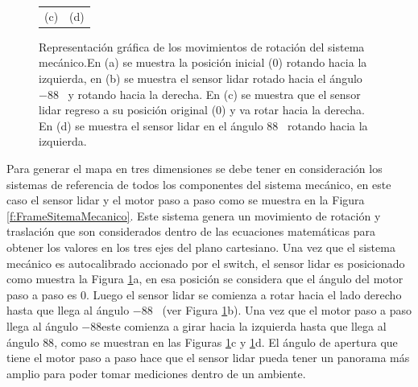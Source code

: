 \begin{figure}
\begin{tabular}{cc}
        (c)&(d)
    \end{tabular}
  \captionsetup{font=footnotesize}
    \caption{\label{f:Rot3D}Representación gráfica de los movimientos de rotación del sistema 
    mecánico.En (a) se muestra la posición inicial (0\grad) rotando hacia la izquierda, en (b) se 
    muestra el sensor lidar rotado hacia el ángulo $-88$\grad~ y rotando hacia la derecha. En (c) 
    se muestra que el sensor lidar regreso a su posición original (0\grad) y va rotar hacia la 
    derecha. En (d) se muestra el sensor lidar en el ángulo $88$\grad~ rotando hacia la izquierda.}
\end{figure}

Para generar el mapa en tres dimensiones se debe tener en consideración los sistemas de referencia 
de todos los componentes del sistema mecánico, en este caso el sensor lidar y el motor paso a paso
como se muestra en la Figura \ref{f:FrameSitemaMecanico}. Este sistema genera un movimiento de rotación
y traslación que son considerados dentro de las ecuaciones matemáticas para obtener los valores en los 
tres ejes del plano cartesiano. Una vez que el sistema mecánico es autocalibrado accionado por el 
switch, el sensor lidar es posicionado como muestra la Figura \ref{f:Rot3D}a, en esa posición se 
considera que el ángulo del motor paso a paso es 0\grad. Luego el sensor lidar se comienza a rotar 
hacia el lado derecho hasta que llega al ángulo $-88$\grad~ (ver Figura \ref{f:Rot3D}b). Una vez que
el motor paso a paso llega al ángulo $-88$\grad este comienza a girar hacia la izquierda hasta 
que llega al ángulo $88$\grad, como se muestran en las Figuras \ref{f:Rot3D}c y \ref{f:Rot3D}d. El 
ángulo de apertura que tiene el motor paso a paso hace que el sensor lidar pueda tener un 
panorama más amplio para poder tomar mediciones dentro de un ambiente.

